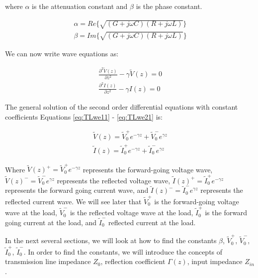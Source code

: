 \documentclass{ximera}
\begin{document}
where $\alpha$ is the attenuation constant and $\beta$ is the phase
constant.

\begin{eqnarray}
\alpha=Re\{ \sqrt{(G+j\omega C)  (R+j\omega L)  }  \} \nonumber \\ \nonumber
\beta = Im\{ \sqrt{(G+j\omega C)  (R+j\omega L)  }  \}
\end{eqnarray}

We can now write wave equations as:


\begin{eqnarray}
\frac{\partial^2 \tilde{V}(z)}{\partial z^2} -\gamma
 \tilde{V}(z)=0  \label{eq:TLwe11} \\ 
\frac{\partial^2 I(z)}{\partial z^2}- \gamma
I(z)=0 \label{eq:TLwe21}
\end{eqnarray}


The general solution of the second order differential equations with constant coefficients
Equations \ref{eq:TLwe11} - \ref{eq:TLwe21}   is:

\begin{eqnarray}
\tilde{V}(z)=\tilde{V}_0^+ e^{-\gamma z} + \tilde{V}_0^- e^{\gamma z} \nonumber \\ \nonumber
\tilde{I}(z)=\tilde{I}_0^+ e^{-\gamma z} + \tilde{I}_0^- e^{\gamma z}
\end{eqnarray}

Where $\tilde{V}(z)^+=\tilde{V}_0^+ e^{-\gamma z}$ represents the forward-going voltage wave, $\tilde{V}(z)^-=\tilde{V}_0^- e^{\gamma z}$ represents the reflected voltage wave, $\tilde{I}(z)^+=\tilde{I}_0^+ e^{-\gamma z}$ represents the forward going current wave, and $\tilde{I}(z)^-=\tilde{I}_0^- e^{\gamma z}$ represents the reflected current wave. We will see later that $\tilde{V}_0^+$ is the forward-going voltage wave at the load, $\tilde{V}_0^-$ 
is the reflected voltage wave at the load, $\tilde{I}_0^+$ is the forward going current at the load, and $\tilde{I}_0^-$ reflected current at the load.


In the next several sections, we will look at how to find the constants $\beta$, $\tilde{V}_0^+  $, $ \tilde{V}_0^-$, $\tilde{I}_0^+ $, $\tilde{I}_0^-$. In order to find the constants, we will introduce the concepts of transmission line impedance $Z_0$, reflection coefficient $\Gamma(z)$, input impedance $Z_{in}$. 
\end{document}
